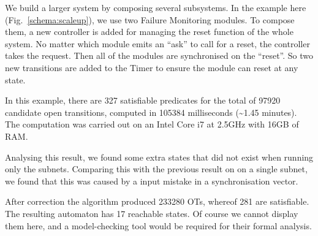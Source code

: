 \documentclass{lncs/llncs}
\begin{document}
We build a larger system by composing several subsystems. In the
example here (Fig.~\ref{schema:scaleup}), we use two Failure
Monitoring modules. 
To compose them, a new controller is added for managing the reset
function of the whole system.  
No matter which module emits an ``ask'' to call for a reset, the
controller takes the request. Then all of the modules are synchronised
on the ``reset''. 
So two new transitions are added to the Timer to ensure the
module can reset at any state. 

In this example, there are 327 satisfiable predicates for the total of 97920 candidate open transitions, computed in 105384 milliseconds (\textasciitilde{}1.45 minutes). 
The computation was carried out on an Intel Core i7 at 2.5GHz with 16GB of RAM.

Analysing this result, we found some extra states that did not exist
when running only the subnets.
Comparing this with the previous result on on a single subnet, we
found that this was caused by a input mistake in a synchronisation vector.

After correction the algorithm produced 233280 OTs, whereof 281 are
satisfiable. The resulting automaton has 17 reachable states. Of
course we cannot display them here, and a model-checking tool would be
required for their formal analysis.
\end{document}
